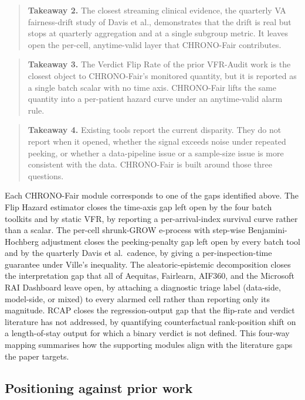\documentclass[acmsmall,nonacm,review,anonymous]{acmart}
\newcommand{\1}[1]{\mathbf{1}\!\left\{#1\right\}}
\begin{document}
\begin{quote}
\textbf{Takeaway 2.} The closest streaming clinical evidence, the quarterly VA fairness-drift study of Davis et al., demonstrates that the drift is real but stops at quarterly aggregation and at a single subgroup metric. It leaves open the per-cell, anytime-valid layer that CHRONO-Fair contributes.
\end{quote}

\begin{quote}
\textbf{Takeaway 3.} The Verdict Flip Rate of the prior VFR-Audit work is the closest object to CHRONO-Fair's monitored quantity, but it is reported as a single batch scalar with no time axis. CHRONO-Fair lifts the same quantity into a per-patient hazard curve under an anytime-valid alarm rule.
\end{quote}

\begin{quote}
\textbf{Takeaway 4.} Existing tools report the current disparity. They do not report when it opened, whether the signal exceeds noise under repeated peeking, or whether a data-pipeline issue or a sample-size issue is more consistent with the data. CHRONO-Fair is built around those three questions.
\end{quote}

Each CHRONO-Fair module corresponds to one of the gaps identified above. The Flip Hazard estimator closes the time-axis gap left open by the four batch toolkits and by static VFR, by reporting a per-arrival-index survival curve rather than a scalar. The per-cell shrunk-GROW e-process with step-wise Benjamini-Hochberg adjustment closes the peeking-penalty gap left open by every batch tool and by the quarterly Davis et al.\ cadence, by giving a per-inspection-time guarantee under Ville's inequality. The aleatoric-epistemic decomposition closes the interpretation gap that all of Aequitas, Fairlearn, AIF360, and the Microsoft RAI Dashboard leave open, by attaching a diagnostic triage label (data-side, model-side, or mixed) to every alarmed cell rather than reporting only its magnitude. RCAP closes the regression-output gap that the flip-rate and verdict literature has not addressed, by quantifying counterfactual rank-position shift on a length-of-stay output for which a binary verdict is not defined. This four-way mapping summarises how the supporting modules align with the literature gaps the paper targets.

\subsection{Positioning against prior work}
\end{document}
